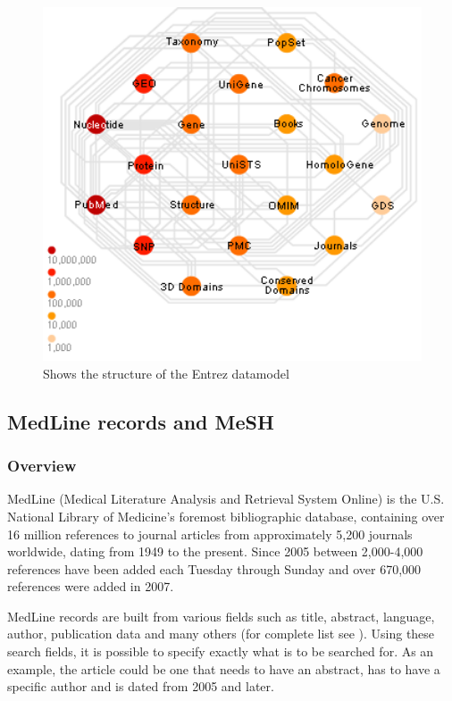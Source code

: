 \begin{figure}[H]
        \begin{center}
          \includegraphics[width=1.0\textwidth]{drawings/entrez_datamodel.png}
        \end{center}
        \caption{Shows the structure of the Entrez datamodel}
        \label{EntrezDatamodel}
\end{figure}

\subsection{MedLine records and MeSH\label{MedLine_records_MeSH}}

\subsubsection{Overview}
MedLine (Medical Literature Analysis and Retrieval System Online)
\cite{PubMedFactSheetMedline} is the U.S. National Library of
Medicine's foremost bibliographic database, containing over 16 million
references to journal articles from approximately 5,200 journals
worldwide, dating from 1949 to the present. Since 2005 between
2,000-4,000 references have been added each Tuesday through Sunday and
over 670,000 references were added in 2007.

MedLine records are built from various fields such as title, abstract,
language, author, publication data and many others (for complete list
see \cite{PubMedHelpSearchFieldDescriptionsTags}). Using these search
fields, it is possible to specify exactly what is to be searched
for. As an example, the article could be one that needs to have an
abstract, has to have a specific author and is dated from 2005 and
later.

